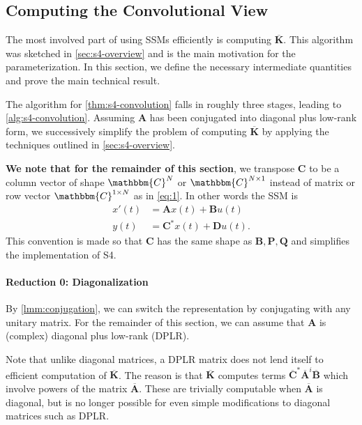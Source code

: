 \subsection{Computing the Convolutional View}
\label{sec:s4-convolution-proof}

The most involved part of using SSMs efficiently is computing \( \bm{\overline{K}} \).
This algorithm was sketched in \cref{sec:s4-overview} and is the main motivation for the \methodabbrv{} parameterization.
In this section, we define the necessary intermediate quantities and prove the main technical result. %


The algorithm for \cref{thm:s4-convolution} falls in roughly three stages, leading to \cref{alg:s4-convolution}.
Assuming \( \bm{A} \) has been conjugated into diagonal plus low-rank form, we successively simplify the problem of computing \( \bm{\overline{K}} \)
by applying the techniques outlined in \cref{sec:s4-overview}.

\begin{remark}
  \textbf{We note that for the remainder of this section}, we transpose \( \bm{C} \) to be a column vector of shape \( \mathbbm{C}^{N} \) or \( \mathbbm{C}^{N \times 1} \) instead of matrix or row vector \( \mathbbm{C}^{1 \times N} \) as in \eqref{eq:1}.
  In other words the SSM is
  \begin{equation}
    \begin{aligned}
      x'(t) &= \bm{A}x(t) + \bm{B}u(t) \\
      y(t) &= \bm{C}^* x(t) + \bm{D}u(t)
      .
    \end{aligned}
  \end{equation}
  This convention is made so that \( \bm{C} \) has the same shape as \( \bm{B}, \bm{P}, \bm{Q} \) and simplifies the implementation of S4.
\end{remark}

\paragraph{Reduction 0: Diagonalization}
By \cref{lmm:conjugation}, we can switch the representation by conjugating with any unitary matrix.
For the remainder of this section, we can assume that \( \bm{A} \) is (complex) diagonal plus low-rank (DPLR).

Note that unlike diagonal matrices, a DPLR matrix does not lend itself to efficient computation of \( \bm{\overline{K}} \).
The reason is that \( \bm{\overline{K}} \) computes terms \( \bm{\overline{C}}^* \bm{\overline{A}}^i \bm{\overline{B}} \) which involve powers of the matrix \( \bm{\overline{A}} \).
These are trivially computable when \( \bm{\overline{A}} \) is diagonal, but is no longer possible for even simple modifications to diagonal matrices such as DPLR.

